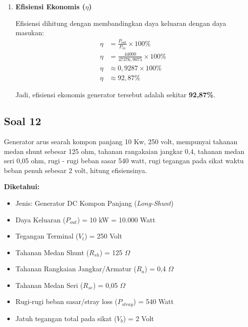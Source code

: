 \documentclass[12pt, a4paper]{article}
\begin{document}
\begin{enumerate}[label=\alph*.]
    Daya masukan adalah daya keluaran ditambah dengan rugi total:
    \begin{align*}
        P_{in} &= P_{out} + P_{rugi\_total} \\
        P_{in} &= 44000 + 3376,9075 \\
        P_{in} &= 47376,9075 \text{ Watt} \approx 47,38 \text{ kW}
    \end{align*}

    Jadi, daya masukan generator tersebut adalah \textbf{47376,9075 Watt}.

    \item \textbf{Efisiensi Ekonomis ($\eta$)}

    Efisiensi dihitung dengan membandingkan daya keluaran dengan daya masukan:
    \begin{align*}
        \eta &= \frac{P_{out}}{P_{in}} \times 100\% \\
        \eta &= \frac{44000}{47376,9075} \times 100\% \\
        \eta &\approx 0,9287 \times 100\% \\
        \eta &\approx 92,87\%
    \end{align*}

    Jadi, efisiensi ekonomis generator tersebut adalah sekitar \textbf{92,87\%}.
\end{enumerate}

\subsection*{Soal 12}
Generator arus searah kompon panjang 10 Kw, 250 volt, mempunyai tahanan medan shunt sebesar 125 ohm, tahanan rangakaian jangkar 0,4, tahanan medan seri 0,05 ohm, rugi - rugi beban sasar 540 watt, rugi tegangan pada sikat waktu beban penuh sebesar 2 volt, hitung efisiensinya.

\textbf{Diketahui:}
\begin{itemize}
    \item Jenis: Generator DC Kompon Panjang (\textit{Long-Shunt})
    \item Daya Keluaran ($P_{out}$) = 10 kW = 10.000 Watt
    \item Tegangan Terminal ($V_t$) = 250 Volt
    \item Tahanan Medan Shunt ($R_{sh}$) = 125 $\Omega$
    \item Tahanan Rangkaian Jangkar/Armatur ($R_a$) = 0,4 $\Omega$
    \item Tahanan Medan Seri ($R_{se}$) = 0,05 $\Omega$
    \item Rugi-rugi beban sasar/stray loss ($P_{stray}$) = 540 Watt
    \item Jatuh tegangan total pada sikat ($V_b$) = 2 Volt
\end{itemize}
\end{document}
